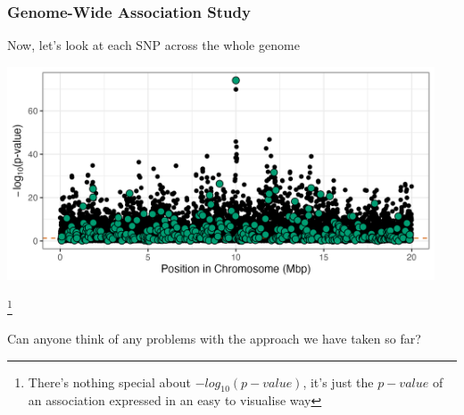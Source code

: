 \documentclass[xcolor=dvipsnames]{beamer}
\newcommand\blfootnote[1]{%
	\begingroup
	\renewcommand\thefootnote{}\footnote{#1}%
	\addtocounter{footnote}{-1}%
	\endgroup
}
\begin{document}
\begin{frame}
	\frametitle{Genome-Wide Association Study}
	Now, let's look at each SNP across the whole genome 
	
	\includegraphics[keepaspectratio, width  = 0.95\textwidth]{img/uncorPlot_DataHlineTrue}				
	
	\blfootnote{There's nothing special about $-log_{10}(p-value)$, it's just the $p-value$ of an association expressed in an easy to visualise way}
\end{frame}


\begin{frame}
	\Huge
	Can anyone think of any problems with the approach we have taken so far?

\end{frame}
\end{document}
